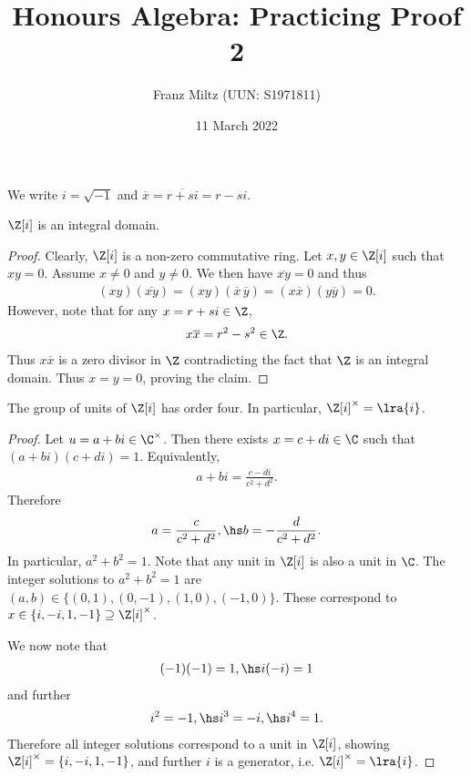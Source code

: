 \documentclass{article}
\begin{document}
\title{Honours Algebra: Practicing Proof 2}
\author{Franz Miltz (UUN: S1971811)}
\date{11 March 2022}
\maketitle
\newcommand{\gaussint}{\Z[i]}
We write $i=\sqrt{-1}$ and $\overline x = \overline{r+si} = r - si$.
\begin{claim*}[1]
	$\Z[i]$ is an integral domain.
	\begin{proof}
		Clearly, $\gaussint$ is a non-zero commutative ring. Let $x,y\in\gaussint$ such that
		$xy=0$. Assume $x\not=0$ and $y\not=0$. We then have $\overline{xy}=0$ and thus
		\begin{align*}
			(xy)(\overline{xy})=(xy)(\overline x\,\overline y)=(x\overline x)(y\overline y) = 0.
		\end{align*}
		However, note that for any $x=r+si\in\Z$,
		\begin{align*}
			x\overline x = r^2-s^2 \in\Z.
		\end{align*}
		Thus $x\overline x$ is a zero divisor in $\Z$ contradicting the fact that $\Z$ is an
		integral domain. Thus $x=y=0$, proving the claim.
	\end{proof}
\end{claim*}

\begin{claim*}[2]
	The group of units of $\gaussint$ has order four. In particular, $\gaussint^\times = \lra{i}$.
	\begin{proof}
		Let $u=a+bi\in\C^\times$. Then there exists $x=c+di\in\C$ such that $(a+bi)(c+di) = 1$.
		Equivalently,
		\begin{align*}
			a+bi = \frac{c-di}{c^2+d^2}.
		\end{align*}
		Therefore
		\begin{align*}
			a = \frac{c}{c^2+d^2},\hs b=-\frac{d}{c^2+d^2}.
		\end{align*}
		In particular, $a^2+b^2=1$. Note that any unit in $\gaussint$ is also a unit in $\C$.
		The integer solutions to $a^2+b^2=1$ are $(a,b)\in\{(0,1),(0,-1),(1,0),(-1,0)\}$.
		These correspond to $x\in\{i,-i,1,-1\}\supseteq\gaussint^\times$.

		We now note that
		\begin{align*}
			(-1)(-1) = 1,\hs i(-i) = 1
		\end{align*}
		and further
		\begin{align*}
			i^2 = -1,\hs i^3 = -i, \hs i^4 = 1.
		\end{align*}
		Therefore all integer solutions correspond to a unit in $\gaussint$, showing
		$\gaussint^\times=\{i,-i,1,-1\}$, and further $i$ is a generator, i.e. $\gaussint^\times=\lra{i}$.
	\end{proof}
\end{claim*}
\end{document}

